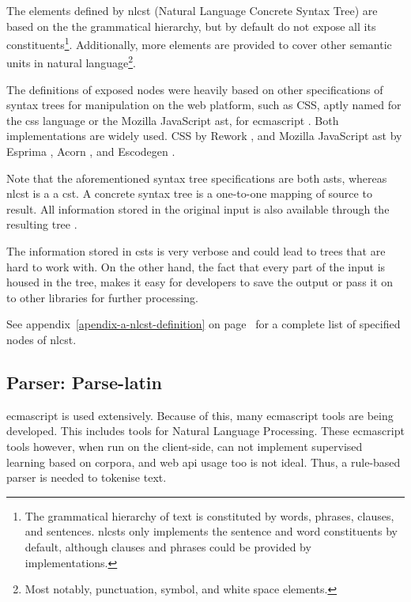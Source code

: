 The elements defined by \gls{nlcst} (Natural Language Concrete Syntax
Tree) are based on the the grammatical hierarchy, but by default do not
expose all its constituents\footnote{The grammatical hierarchy of text
  is constituted by words, phrases, clauses, and sentences.
  \glspl{nlcst} only implements the sentence and word constituents by
  default, although clauses and phrases could be provided by
  implementations.}. Additionally, more elements are provided to cover
other semantic units in natural language\footnote{Most notably,
  punctuation, symbol, and white space elements.}.

The definitions of exposed nodes were heavily based on other
specifications of syntax trees for manipulation on the web platform,
such as CSS, aptly named for the \acrshort{css} language
\autocite{reworkcss/css-source-code} or the Mozilla JavaScript
\acrshort{ast}, for \gls{ecmascript}
\autocite{mozilla.org-spidermonkey-parser_api}. Both implementations are
widely used. CSS by Rework \autocite{reworkcss/rework-source-code}, and
Mozilla JavaScript \gls{ast} by Esprima
\autocite{ariya/esprima-source-code}, Acorn
\autocite{marijnh/acorn-source-code}, and Escodegen
\autocite{constellation/escodegen-source-code}.

Note that the aforementioned syntax tree specifications are both
\glspl{ast}, whereas \gls{nlcst} is a a \gls{cst}. A concrete syntax
tree is a one-to-one mapping of source to result. All information stored
in the original input is also available through the resulting tree
\autocite{thegreenplace.net-abstract-concrete-syntax-trees}.

The information stored in \glspl{cst} is very verbose and could lead to
trees that are hard to work with. On the other hand, the fact that every
part of the input is housed in the tree, makes it easy for developers to
save the output or pass it on to other libraries for further processing.

See appendix~\ref{apendix-a-nlcst-definition} on
page~\pageref{apendix-a-nlcst-definition} for a complete list of
specified nodes of \gls{nlcst}.

\subsection{Parser: Parse-latin}\label{parser-parse-latin}

\Gls{ecmascript} is used extensively. Because of this, many \gls{ecmascript} tools
are being developed. This includes tools for Natural Language
Processing. These \gls{ecmascript} tools however, when run on the client-side,
can not implement supervised learning based on corpora, and web
\gls{api} usage too is not ideal. Thus, a rule-based parser is needed to
tokenise text.


